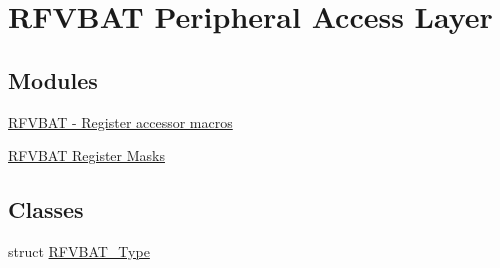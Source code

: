 \hypertarget{group__RFVBAT__Peripheral__Access__Layer}{}\section{R\+F\+V\+B\+AT Peripheral Access Layer}
\label{group__RFVBAT__Peripheral__Access__Layer}
\subsection*{Modules}
\begin{DoxyCompactItemize}
\item 
\hyperlink{group__RFVBAT__Register__Accessor__Macros}{R\+F\+V\+B\+A\+T -\/ Register accessor macros}
\item 
\hyperlink{group__RFVBAT__Register__Masks}{R\+F\+V\+B\+A\+T Register Masks}
\end{DoxyCompactItemize}
\subsection*{Classes}
\begin{DoxyCompactItemize}
\item 
struct \hyperlink{structRFVBAT__Type}{R\+F\+V\+B\+A\+T\+\_\+\+Type}
\end{DoxyCompactItemize}
